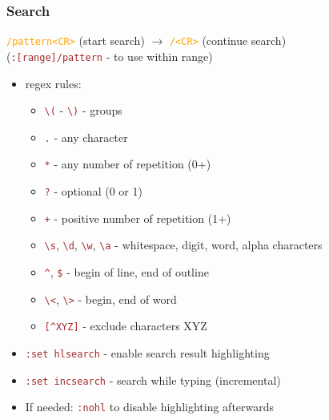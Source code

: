 \documentclass{beamer}
\newcommand{\vimnormal}[1]{\texttt{\textcolor{orange}{#1}}}
\newcommand{\vimcommand}[1]{\texttt{\textcolor{brown}{#1}}}
\newcommand{\vimkey}[1]{\textless{}#1\textgreater{}}
\begin{document}
\begin{frame}
    \frametitle{Search}
    \vimnormal{/pattern\vimkey{CR}} (start search) $\rightarrow$ \vimnormal{/\vimkey{CR}} (continue search)\\
    (\vimcommand{:[range]/pattern} - to use within range)
    \begin{itemize}
        \item regex rules:
        \begin{itemize}
            \item \vimcommand{\textbackslash{(}} - \vimcommand{\textbackslash{)}} - groups
            \item \vimcommand{.} - any character
            \item \vimcommand{*} - any number of repetition (0+)
            \item \vimcommand{?} - optional (0 or 1)
            \item \vimcommand{+} - positive number of repetition (1+)
            \item \vimcommand{\textbackslash{s}}, \vimcommand{\textbackslash{d}}, \vimcommand{\textbackslash{w}}, \vimcommand{\textbackslash{a}} - whitespace, digit, word, alpha characters
            \item \vimcommand{\string^}, \vimcommand{\$} - begin of line, end of outline
            \item \vimcommand{\textbackslash{\textless}}, \vimcommand{\textbackslash{\textgreater}} - begin, end of word
            \item \vimcommand{[\string^XYZ]} - exclude characters XYZ
        \end{itemize}
        \item \vimcommand{:set hlsearch} - enable search result highlighting
        \item \vimcommand{:set incsearch} - search while typing (incremental)
        \item If needed: \vimcommand{:nohl} to disable highlighting afterwards
    \end{itemize}
\end{frame}
\end{document}

